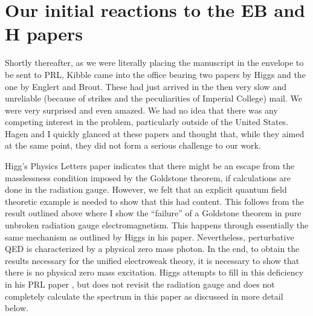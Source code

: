\documentclass[12pt]{article}
\begin{document}
  \section{Our initial reactions to the EB and H papers} \label{sec:7}


  Shortly thereafter, as we were literally placing the manuscript in the
  envelope to be sent to PRL, Kibble came into the office bearing two papers
  by Higgs and the one by Englert and Brout. These had just arrived in the
  then very slow and unreliable (because of strikes and the peculiarities of
  Imperial College) mail. We were very surprised and even amazed. We had no
  idea that there was any competing interest in the problem, particularly
  outside of the United States. Hagen and I quickly glanced at these papers
  and thought that, while they aimed at the same point, they did not form a
  serious challenge to our work.

  Higg's Physics Letters paper \cite{phpl;1964} indicates that there might be
  an escape from the masslessness condition imposed by the Goldstone theorem,
  if calculations are done in the radiation gauge. However, we felt that an
  explicit quantum field theoretic example is needed to show that this had
  content. This follows from the result outlined above where I show the
  ``failure'' of a Goldstone theorem in pure unbroken radiation gauge
  electromagnetism. This happens through essentially the same mechanism as
  outlined by Higgs in his paper. Nevertheless, perturbative QED is
  characterized by a physical zero mass photon. In the end, to obtain the
  results necessary for the unified electroweak theory, it is necessary to
  show that there is no physical zero mass excitation.  Higgs attempts to fill
  in this deficiency in his PRL paper \cite{ph;1964}, but does not revisit the
  radiation gauge and does not completely calculate the spectrum in this paper
  as discussed in more detail below.
\end{document}
